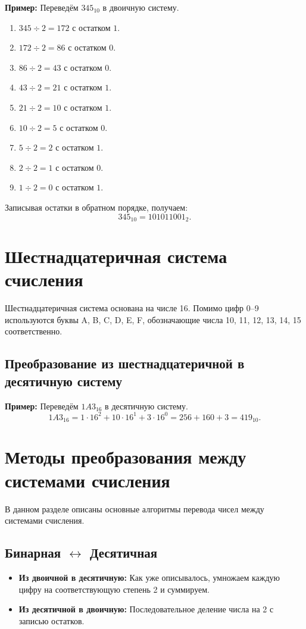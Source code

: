 \documentclass[12pt,a4paper]{article}
\begin{document}
\textbf{Пример:} Переведём \(345_{10}\) в двоичную систему.
\begin{enumerate}
    \item \(345 \div 2 = 172\) с остатком \(1\).
    \item \(172 \div 2 = 86\) с остатком \(0\).
    \item \(86 \div 2 = 43\) с остатком \(0\).
    \item \(43 \div 2 = 21\) с остатком \(1\).
    \item \(21 \div 2 = 10\) с остатком \(1\).
    \item \(10 \div 2 = 5\) с остатком \(0\).
    \item \(5 \div 2 = 2\) с остатком \(1\).
    \item \(2 \div 2 = 1\) с остатком \(0\).
    \item \(1 \div 2 = 0\) с остатком \(1\).
\end{enumerate}
Записывая остатки в обратном порядке, получаем:
\[
345_{10} = 101011001_2.
\]

\section{Шестнадцатеричная система счисления}
Шестнадцатеричная система основана на числе 16. Помимо цифр 0--9 используются буквы A, B, C, D, E, F, обозначающие числа 10, 11, 12, 13, 14, 15 соответственно.

\subsection{Преобразование из шестнадцатеричной в десятичную систему}
\textbf{Пример:} Переведём \(1A3_{16}\) в десятичную систему.
\[
1A3_{16} = 1\cdot16^2 + 10\cdot16^1 + 3\cdot16^0 = 256 + 160 + 3 = 419_{10}.
\]

\section{Методы преобразования между системами счисления}
В данном разделе описаны основные алгоритмы перевода чисел между системами счисления.

\subsection{Бинарная \(\leftrightarrow\) Десятичная}
\begin{itemize}
    \item \textbf{Из двоичной в десятичную:} Как уже описывалось, умножаем каждую цифру на соответствующую степень 2 и суммируем.
    \item \textbf{Из десятичной в двоичную:} Последовательное деление числа на 2 с записью остатков.
\end{itemize}
\end{document}
